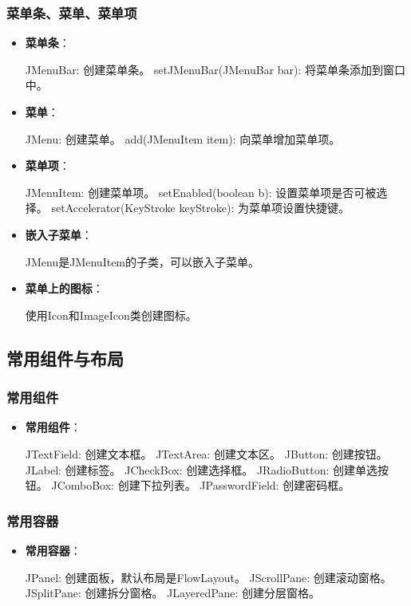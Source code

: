 \documentclass[a4paper, 10pt]{ctexart}
\begin{document}
\subsubsection{菜单条、菜单、菜单项}
\begin{itemize}
  \item \textbf{菜单条}：
  \begin{codeblock}
JMenuBar: 创建菜单条。
setJMenuBar(JMenuBar bar): 将菜单条添加到窗口中。
  \end{codeblock}
  \item \textbf{菜单}：
  \begin{codeblock}
JMenu: 创建菜单。
add(JMenuItem item): 向菜单增加菜单项。
  \end{codeblock}
  \item \textbf{菜单项}：
  \begin{codeblock}
JMenuItem: 创建菜单项。
setEnabled(boolean b): 设置菜单项是否可被选择。
setAccelerator(KeyStroke keyStroke): 为菜单项设置快捷键。
  \end{codeblock}
  \item \textbf{嵌入子菜单}：
  \begin{codeblock}
JMenu是JMenuItem的子类，可以嵌入子菜单。
  \end{codeblock}
  \item \textbf{菜单上的图标}：
  \begin{codeblock}
使用Icon和ImageIcon类创建图标。
  \end{codeblock}
\end{itemize}

\subsection{常用组件与布局}
\subsubsection{常用组件}
\begin{itemize}
  \item \textbf{常用组件}：
  \begin{codeblock}
JTextField: 创建文本框。
JTextArea: 创建文本区。
JButton: 创建按钮。
JLabel: 创建标签。
JCheckBox: 创建选择框。
JRadioButton: 创建单选按钮。
JComboBox: 创建下拉列表。
JPasswordField: 创建密码框。
  \end{codeblock}
\end{itemize}

\subsubsection{常用容器}
\begin{itemize}
  \item \textbf{常用容器}：
  \begin{codeblock}
JPanel: 创建面板，默认布局是FlowLayout。
JScrollPane: 创建滚动窗格。
JSplitPane: 创建拆分窗格。
JLayeredPane: 创建分层窗格。
  \end{codeblock}
\end{itemize}
\end{document}
